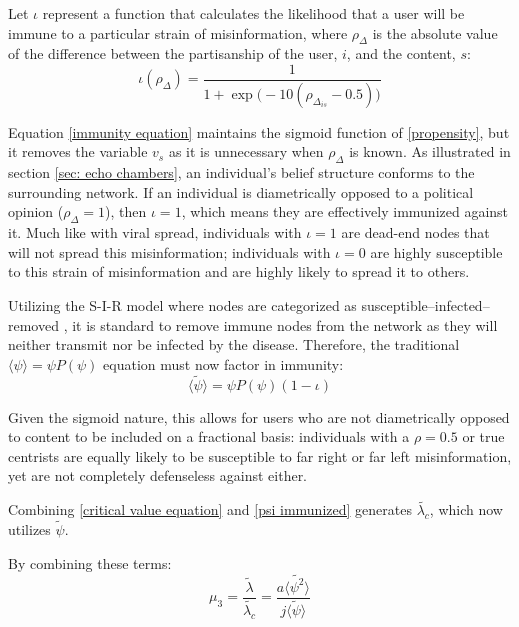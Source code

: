 \documentclass[preprint,review,12pt]{elsarticle}
\begin{document}
Let $\iota$ represent a function that calculates the likelihood that a user will be immune to a particular strain of misinformation, where $\rho_{\Delta}$ is the absolute value of the difference between the partisanship of the user, $i$, and the content, $s$:
\begin{equation}
\label{immunity equation}
    \iota(\rho_{\Delta})=\frac{1}{1+\exp{\big(-10 (\rho_{\Delta_{is}}-0.5)\big)}}
\end{equation}

Equation \ref{immunity equation} maintains the sigmoid function of \ref{propensity}, but it removes the variable $v_s$ as it is unnecessary when $\rho_{\Delta}$ is known. As illustrated in section \ref{sec: echo chambers}, an individual's belief structure conforms to the surrounding network. If an individual is diametrically opposed to a political opinion ($\rho_{\Delta} = 1$), then $\iota = 1$, which means they are effectively immunized against it. Much like with viral spread, individuals with $\iota = 1$ are dead-end nodes that will not spread this misinformation; individuals with $\iota = 0$ are highly susceptible to this strain of misinformation and are highly likely to spread it to others.

Utilizing the S-I-R model where nodes are categorized as susceptible–infected–removed \cite{ferrari2006network,bailey1975mathematical,newman2005threshold,newman2002spread}, it is standard to remove immune nodes from the network as they will neither transmit nor be infected by the disease. Therefore, the traditional $\langle \psi \rangle = \psi P(\psi)$ equation must now factor in immunity:
\begin{equation}
\label{psi immunized}
 \langle \tilde{\psi} \rangle =  \psi P(\psi)(1-\iota)
\end{equation}

Given the sigmoid nature, this allows for users who are not diametrically opposed to content to be included on a fractional basis: individuals with a $\rho = 0.5$ or true centrists are equally likely to be susceptible to far right or far left misinformation, yet are not completely defenseless against either.

Combining \ref{critical value equation} and \ref{psi immunized} generates $\tilde{\lambda_c}$, which now utilizes $\tilde{\psi}$.

By combining these terms:
\begin{equation}
\label{mu_3 equation}
    \mu_3 = \frac{\tilde{\lambda}}{\tilde{\lambda_c}} = \frac{a \langle \tilde{\psi^2} \rangle}{j\langle \tilde{\psi} \rangle}
\end{equation}
\end{document}
